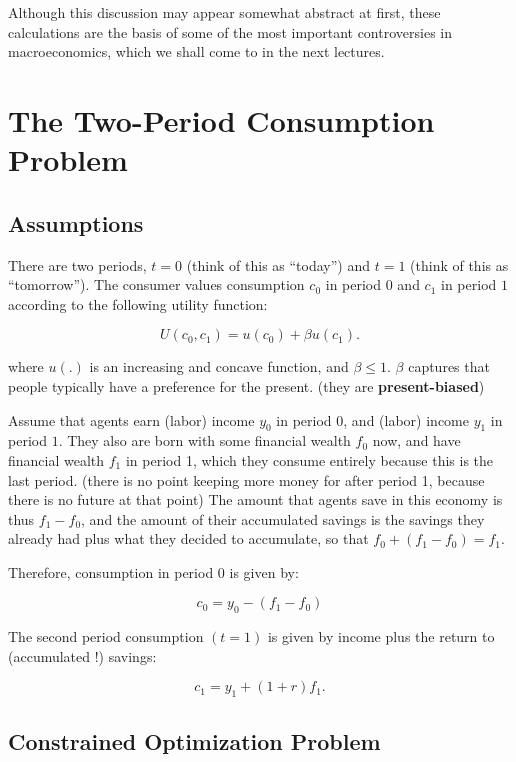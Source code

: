 \documentclass[]{book}
\theoremstyle{definition}
\theoremstyle{definition}
\theoremstyle{definition}
\theoremstyle{remark}
\begin{document}
Although this discussion may appear somewhat abstract at first, these
calculations are the basis of some of the most important controversies
in macroeconomics, which we shall come to in the next lectures.

\section{The Two-Period Consumption
Problem}\label{the-two-period-consumption-problem}

\subsection{Assumptions}\label{assumptions}

There are two periods, \(t=0\) (think of this as ``today'') and \(t=1\)
(think of this as ``tomorrow''). The consumer values consumption \(c_0\)
in period \(0\) and \(c_1\) in period \(1\) according to the following
utility function:

\[U(c_{0},c_{1})=u(c_{0})+\beta u(c_{1}).\]

where \(u(.)\) is an increasing and concave function, and
\(\beta \leq 1\). \(\beta\) captures that people typically have a
preference for the present. (they are \textbf{present-biased})

Assume that agents earn (labor) income \(y_{0}\) in period \(0\), and
(labor) income \(y_{1}\) in period \(1\). They also are born with some
financial wealth \(f_{0}\) now, and have financial wealth \(f_{1}\) in
period 1, which they consume entirely because this is the last period.
(there is no point keeping more money for after period 1, because there
is no future at that point) The amount that agents save in this economy
is thus \(f_{1}-f_{0}\), and the amount of their accumulated savings is
the savings they already had plus what they decided to accumulate, so
that \(f_{0}+(f_{1}-f_{0})=f_{1}.\)

Therefore, consumption in period \(0\) is given by:

\[c_{0} =y_{0}-(f_{1}-f_{0})\]

The second period consumption \((t=1)\) is given by income plus the
return to (accumulated !) savings:

\[c_{1} =y_{1}+(1+r)f_{1}.\]

\subsection{Constrained Optimization
Problem}\label{constrained-optimization-problem}
\end{document}
